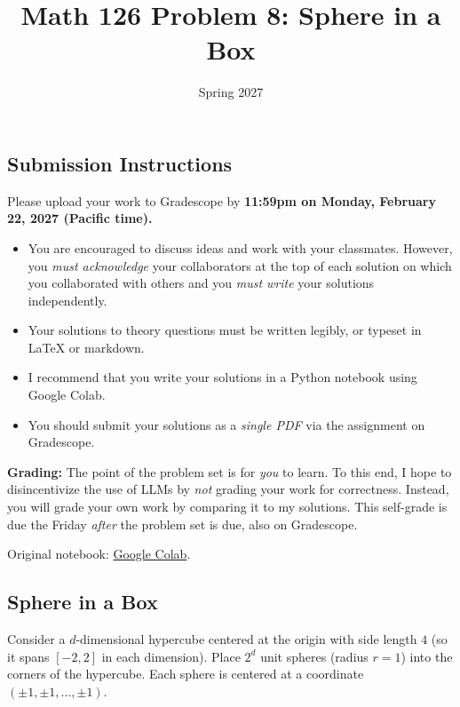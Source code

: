 \documentclass{article}
\title{Math 126 Problem 8: Sphere in a Box}
\author{} %
\date{Spring 2027}
\begin{document}
\maketitle

\hypertarget{submission-instructions}{%
\subsection*{Submission Instructions}\label{submission-instructions}}

Please upload your work to Gradescope by \textbf{11:59pm on Monday, February 22, 2027 (Pacific time).}

\begin{itemize}
\item
  You are encouraged to discuss ideas and work with your classmates. However, you \emph{must acknowledge} your collaborators at the top of each solution on which you collaborated with others and you \emph{must write} your solutions independently.
\item
  Your solutions to theory questions must be written legibly, or typeset in LaTeX or markdown.
\item
  I recommend that you write your solutions in a Python notebook using Google Colab.
\item
  You should submit your solutions as a \emph{single PDF} via the assignment on Gradescope.
\end{itemize}

\textbf{Grading:} The point of the problem set is for \emph{you} to learn. To this end, I hope to disincentivize the use of LLMs by \emph{not} grading your work for correctness. Instead, you will grade your own work by comparing it to my solutions. This self-grade is due the Friday \emph{after} the problem set is due, also on Gradescope.

\noindent Original notebook: \href{https://colab.research.google.com/drive/1HY7qkCvXM856OxkEsTJdbbgv-AZJvyqh?usp=sharing}{Google Colab}.

\hypertarget{sphere-in-a-box}{%
\subsection*{Sphere in a Box}\label{sphere-in-a-box}}

Consider a \(d\)-dimensional hypercube centered at the origin with side length \(4\) (so it spans \([-2, 2]\) in each dimension). Place \(2^d\) unit spheres (radius \(r=1\)) into the corners of the hypercube. Each sphere is centered at a coordinate \((\pm 1, \pm 1, \dots, \pm 1)\).
\end{document}
